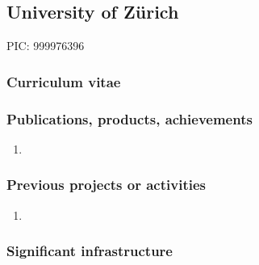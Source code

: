 \subsection*{University of Z\"{u}rich}




PIC: 999976396

\subsubsection*{Curriculum vitae}



%
%

\subsubsection*{Publications, products, achievements}

\begin{enumerate}
\item {}
\end{enumerate}

\subsubsection*{Previous projects or activities}

\begin{enumerate}
\item {}
\end{enumerate}

\subsubsection*{Significant infrastructure}

